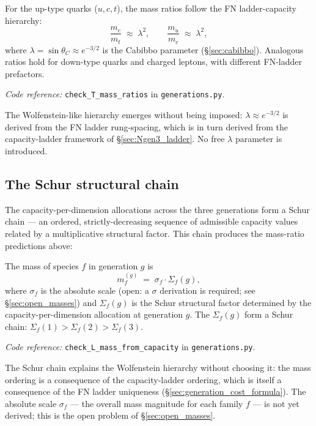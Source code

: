 \documentclass[11pt]{article}
\newcommand{\coderef}[2]{\smallskip\noindent\textit{Code reference:} \texttt{#1} in \texttt{#2}.}
\newcommand{\epitag}[1]{\textbf{[#1]}}
\theoremstyle{definition}
\begin{document}
\begin{tcolorbox}[apfbox, title={$T_{\mathrm{mass\_ratios}}$ \epitag{P\_structural}}]
For the up-type quarks ($u, c, t$), the mass ratios follow the FN ladder-capacity hierarchy:
\[
\frac{m_c}{m_t} \;\approx\; \lambda^2, \qquad \frac{m_u}{m_c} \;\approx\; \lambda^2,
\]
where $\lambda = \sin\theta_C \approx e^{-3/2}$ is the Cabibbo parameter (\S\ref{sec:cabibbo}). Analogous ratios hold for down-type quarks and charged leptons, with different FN-ladder prefactors.
\end{tcolorbox}

\coderef{check\_T\_mass\_ratios}{generations.py}

The Wolfenstein-like hierarchy emerges without being imposed: $\lambda \approx e^{-3/2}$ is derived from the FN ladder rung-spacing, which is in turn derived from the capacity-ladder framework of \S\ref{sec:Ngen3_ladder}. No free $\lambda$ parameter is introduced.

\subsection{The Schur structural chain}\label{sec:schur_chain}

The capacity-per-dimension allocations across the three generations form a Schur chain --- an ordered, strictly-decreasing sequence of admissible capacity values related by a multiplicative structural factor. This chain produces the mass-ratio predictions above:

\begin{tcolorbox}[apfbox, title={$L_{\mathrm{mass\_from\_capacity}}$ \epitag{P\_structural}}]
The mass of species $f$ in generation $g$ is
\[
m_f^{(g)} \;=\; \sigma_f \cdot \Sigma_f(g),
\]
where $\sigma_f$ is the absolute scale (open: a $\sigma$ derivation is required; see \S\ref{sec:open_masses}) and $\Sigma_f(g)$ is the Schur structural factor determined by the capacity-per-dimension allocation at generation $g$. The $\Sigma_f(g)$ form a Schur chain: $\Sigma_f(1) > \Sigma_f(2) > \Sigma_f(3)$.
\end{tcolorbox}

\coderef{check\_L\_mass\_from\_capacity}{generations.py}

The Schur chain explains the Wolfenstein hierarchy without choosing it: the mass ordering is a consequence of the capacity-ladder ordering, which is itself a consequence of the FN ladder uniqueness (\S\ref{sec:generation_cost_formula}). The absolute scale $\sigma_f$ --- the overall mass magnitude for each family $f$ --- is not yet derived; this is the open problem of \S\ref{sec:open_masses}.
\end{document}
